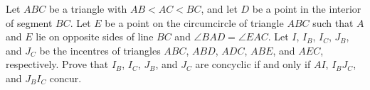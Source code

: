 Let $ABC$ be a triangle with $AB < AC < BC$, and let $D$ be a point in the interior of segment $BC$. Let $E$ be a point on the circumcircle of triangle $ABC$ such that $A$ and $E$ lie on opposite sides of line $BC$ and $\angle BAD = \angle EAC$. Let $I$, $I_B$, $I_C$, $J_B$, and $J_C$ be the incentres of triangles $ABC$, $ABD$, $ADC$, $ABE$, and $AEC$, respectively. Prove that $I_B$, $I_C$, $J_B$, and $J_C$ are concyclic if and only if $AI$, $I_BJ_C$, and $J_BI_C$ concur.
